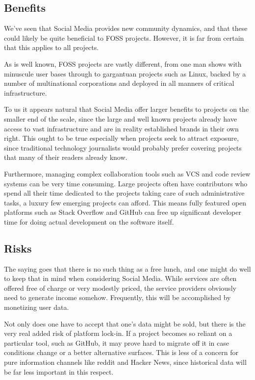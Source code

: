 \documentclass[a4paper,11pt]{article} %
\begin{document}
\subsection{Benefits}

We've seen that Social Media provides new community dynamics, and that
these could likely be quite beneficial to FOSS projects. However, it
is far from certain that this applies to all projects.

As is well known, FOSS projects are vastly different, from one man
shows with minuscule user bases through to gargantuan projects such as
Linux, backed by a number of multinational corporations and deployed
in all manners of critical infrastructure.

To us it appears natural that Social Media offer larger benefits to
projects on the smaller end of the scale, since the large and well
known projects already have access to vast infrastructure and are in
reality established brands in their own right. This ought to be true
especially when projects seek to attract exposure, since traditional
technology journalists would probably prefer covering projects that
many of their readers already know.

Furthermore, managing complex collaboration tools such as VCS and code
review systems can be very time consuming. Large projects often have
contributors who spend all their time dedicated to the projects taking
care of such administrative tasks, a luxury few emerging projects can
afford. This means fully featured open platforms such as Stack
Overflow and GitHub can free up significant developer time for doing
actual development on the software itself.

\subsection{Risks}

The saying goes that there is no such thing as a free lunch, and one
might do well to keep that in mind when considering Social
Media. While services are often offered free of charge or very
modestly priced, the service providers obviously need to generate
income somehow. Frequently, this will be accomplished by monetizing
user data.

Not only does one have to accept that one's data might be sold, but
there is the very real added risk of platform lock-in. If a project
becomes so reliant on a particular tool, such as GitHub, it may prove
hard to migrate off it in case conditions change or a better
alternative surfaces. This is less of a concern for pure information
channels like reddit and Hacker News, since historical data will be
far less important in this respect.
\end{document}
